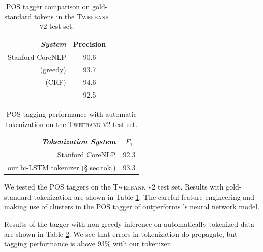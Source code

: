 \documentclass[11pt,a4paper]{article}
\begin{document}
\begin{table}[t]
	\centering
	\begin{tabular}{rc}
		\hline
		\it System & Precision \\
		\hline
		Stanford CoreNLP & 90.6 \\
		\citealp{owoputi-EtAl:2013:NAACL-HLT} (greedy) & 93.7 \\
		\citealp{owoputi-EtAl:2013:NAACL-HLT} (CRF) & 94.6 \\
		\hdashline
		\citealp{ma-hovy:2016:P16-1} & 92.5 \\
		\hline
	\end{tabular}
	\caption{POS tagger comparison on gold-standard tokens in the
          \textsc{Tweebank v2} test set. \label{tbl:pos-result}}
\end{table}

\begin{table}[t]
	\centering
	\begin{tabular}{rc}
		\hline
		\it Tokenization System & $F_1$ \\
		\hline
		Stanford CoreNLP & 92.3 \\
		our bi-LSTM tokenizer (\S\ref{sec:tok}) & 93.3 \\
		\hline
	\end{tabular}
	\caption{\citet{owoputi-EtAl:2013:NAACL-HLT} POS tagging performance with automatic tokenization on
          the \textsc{Tweebank v2} test set. \label{tbl:pos-result-vs-tok}}
\end{table}

We tested the POS taggers on the \textsc{Tweebank v2} test set.  Results
with gold-standard tokenization are shown in
Table \ref{tbl:pos-result}. The careful feature engineering and making use of
\citet{Brown:1992:CNG:176313.176316} clusters in the 
POS tagger of \citet{owoputi-EtAl:2013:NAACL-HLT} outperforms \citet{ma-hovy:2016:P16-1}'s neural network
model. 

Results of the \citet{owoputi-EtAl:2013:NAACL-HLT}  tagger with non-greedy
inference on automatically tokenized data
are shown in  Table \ref{tbl:pos-result-vs-tok}.  We see that errors
in tokenization do propagate, but tagging performance is above 93\%
with our tokenizer. 
\end{document}
